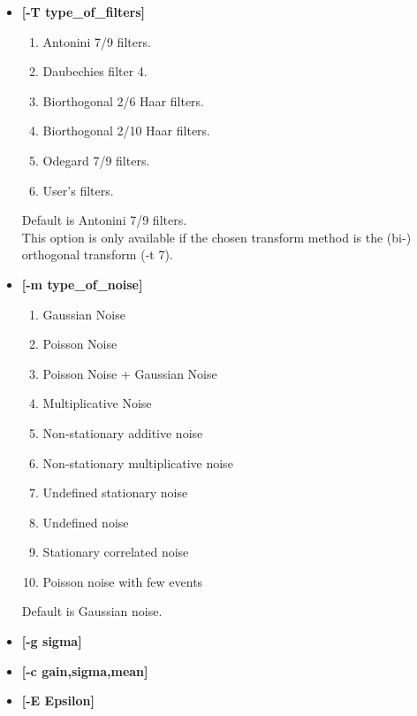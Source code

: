 \begin{itemize}
\begin{enumerate}
\item Undecimated Haar wavelet transform: \`a trous algorithm 
\item morphological median transform 
\item Undecimated (bi-) orthogonal wavelet transform 
\item pyramidal linear wavelet transform 
\item pyramidal B$_3$-spline wavelet transform 
\item pyramidal median transform 
\end{enumerate}
Default is 3. 
\item {\bf [-T type\_of\_filters]}  
{\small
\begin{enumerate}
\baselineskip=0.4truecm
\itemsep=0.1truecm
\item Antonini 7/9 filters. 
\item Daubechies filter 4. 
\item Biorthogonal 2/6 Haar filters.
\item Biorthogonal 2/10 Haar filters.
\item Odegard 7/9 filters.
\item User's filters.
\end{enumerate}}
Default is Antonini 7/9 filters. \\
This option is only available if the chosen transform method is
the (bi-) orthogonal transform (-t 7).
\item {\bf [-m type\_of\_noise]}
{\small
\begin{enumerate}
\itemsep=0.1truecm
\baselineskip=0.4truecm
\item Gaussian Noise 
\item Poisson Noise 
\item Poisson Noise + Gaussian Noise 
\item Multiplicative Noise 
\item Non-stationary additive noise 
\item Non-stationary multiplicative noise 
\item Undefined stationary noise 
\item Undefined noise 
\item Stationary correlated noise 
\item Poisson noise with few events 
\end{enumerate}
}
Default is Gaussian noise.
\item {\bf [-g sigma]} 
\item {\bf [-c gain,sigma,mean]} 
\item {\bf [-E Epsilon]} \\

\end{itemize}
